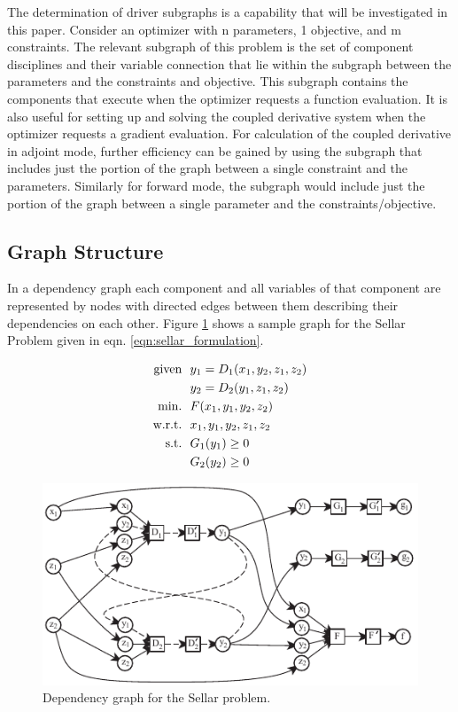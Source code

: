 \documentclass[]{aiaa-tc} %
\newcommand{\txt}{\textrm}
\begin{document}
    The determination of driver subgraphs is a capability that will be investigated in this paper.
    Consider an optimizer with n parameters, 1 objective, and m constraints. The relevant 
    subgraph of this problem is the set of component disciplines and their variable connection that
    lie within the subgraph between the parameters and the constraints and objective. This subgraph
    contains the components that execute when the optimizer requests a function evaluation. It is
    also useful for setting up and solving the coupled derivative system when the optimizer requests
    a gradient evaluation. For calculation of the coupled derivative in adjoint mode, further
    efficiency can be gained by using the subgraph that includes just the portion of the graph 
    between a single constraint and the parameters. Similarly for forward mode, the subgraph would
    include just the portion of the graph between a single parameter and the constraints/objective.


    \subsection{Graph Structure}
    In a dependency graph each component and all variables of that component are 
    represented by nodes with directed edges between them describing their dependencies on each other. 
    Figure \ref{fig:sellar_graph} shows a sample graph for the Sellar Problem \cite{AIAA:sellar} 
    given in eqn. \ref{eqn:sellar_formulation}.  

    \begin{align}
        \txt{given} & \ \ y_1 = D_1(x_1,y_2,z_1,z_2) \notag
        \\      & \ \ y_2 = D_2(y_1,z_1,z_2) \notag
        \\\txt{min.} &\ \ F(x_1,y_1,y_2,z_2) \notag
        \\\txt{w.r.t.} & \ \ x_1,y_1,y_2,z_1,z_2 \notag
        \\\txt{s.t.} & \ \ G_1(y_1) \geq 0 \notag
        \\     & \ \ G_2(y_2) \geq 0
        \label{eqn:sellar_formulation}
    \end{align}


    \begin{figure}[!htb]\begin{center}
      \includegraphics[width=.8\textwidth]{images/sellar_cycles}
      \caption{ Dependency graph for the Sellar problem. \label{fig:sellar_graph}}
    \end{center}\end{figure}
\end{document}
